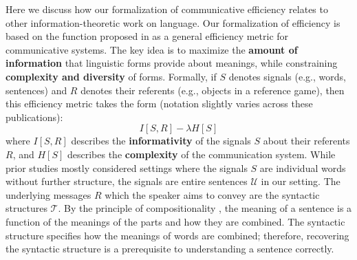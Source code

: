 \documentclass[10pt,twoside,lineno]{article}
\newcommand{\key}[1]{\textbf{#1}}
\newcommand{\utterance}{\mathcal{U}}
\newcommand{\tree}{\mathcal{T}}
\begin{document}
Here we discuss how our formalization of communicative efficiency relates to other information-theoretic work on language.
Our formalization of efficiency is based on the function proposed in \cite{ferreri2003least,ferrericancho2007global,futrell2017memory,peloquin2019interactions} as a general efficiency metric for communicative systems.
The key idea is to maximize the \key{amount of information} that linguistic forms provide about meanings, while constraining \key{complexity and diversity} of forms. %
Formally, if $S$ denotes signals (e.g., words, sentences) and $R$ denotes their referents (e.g., objects in a reference game), then this efficiency metric takes the form (notation slightly varies across these publications):
\begin{equation}\label{eq:eff-general}
I[S, R] - \lambda H[S]
\end{equation}
where $I[S, R]$ describes the \key{informativity} of the signals $S$ about their referents $R$, and $H[S]$ describes the \key{complexity} of the communication system.
While prior studies \cite{ferreri2003least, kemp2012kinship,regier2015word,zaslavsky2018efficient} mostly considered settings where the signals $S$ are individual words without further structure, the signals are entire sentences $\utterance$ in our setting.
The underlying messages $R$ which the speaker aims to convey are the syntactic structures $\tree$.
By the principle of compositionality \cite{frege1892sinn}, the meaning of a sentence is a function of the meanings of the parts and how they are combined.
The syntactic structure specifies how the meanings of words are combined; therefore, recovering the syntactic structure is a prerequisite to understanding a sentence correctly.
\end{document}
